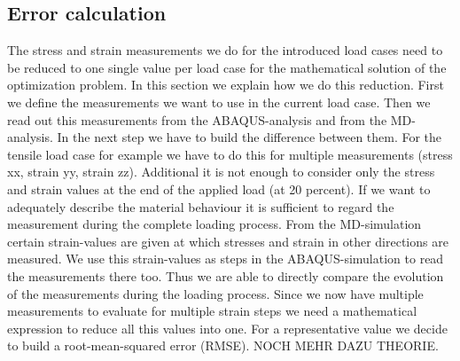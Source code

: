     \subsection{Error calculation}\label{subsec: errorCalculation}
    The stress and strain measurements we do for the introduced load cases need to be reduced to one single value per load case for the mathematical solution of the optimization problem. 
    In this section we explain how we do this reduction. 
    First we define the measurements we want to use in the current load case. Then we read out this measurements from the ABAQUS-analysis and from the MD-analysis. In the next step we have to build the difference between them. For the tensile load case for example we have to do this for multiple measurements (stress xx, strain yy, strain zz). Additional it is not enough to consider only the stress and strain values at the end of the applied load (at 20 percent). If we want to adequately describe the material behaviour it is sufficient to regard the measurement during the complete loading process. From the MD-simulation certain strain-values are given at which stresses and strain in other directions are measured. We use this strain-values as steps in the ABAQUS-simulation to read the measurements there too. Thus we are able to directly compare the evolution of the measurements during the loading process. Since we now have multiple measurements to evaluate for multiple strain steps we need a mathematical expression to reduce all this values into one. For a representative value we decide to build a root-mean-squared error (RMSE). NOCH MEHR DAZU THEORIE. 
